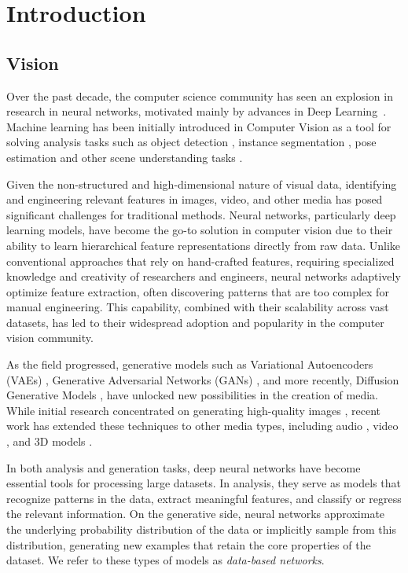 \chapter{Introduction}

\section{Vision}

Over the past decade, the computer science community has seen an explosion in research in neural networks, motivated mainly by advances in Deep Learning~\citep{lecun2015deep,goodfellow2016deep}. Machine learning has been initially introduced in Computer Vision as a tool for solving analysis tasks such as object detection \citep{redmon2016you}, instance segmentation \citep{he2017mask}, pose estimation \citep{cao2019openpose} and other scene understanding tasks \citep{eigen2014depth, long2015fully, vinyals2015show, guler2018densepose}. 

Given the non-structured and high-dimensional nature of visual data, identifying and engineering relevant features in images, video, and other media has posed significant challenges for traditional methods. Neural networks, particularly deep learning models, have become the go-to solution in computer vision due to their ability to learn hierarchical feature representations directly from raw data. Unlike conventional approaches that rely on hand-crafted features, requiring specialized knowledge and creativity of researchers and engineers, neural networks adaptively optimize feature extraction, often discovering patterns that are too complex for manual engineering. This capability, combined with their scalability across vast datasets, has led to their widespread adoption and popularity in the computer vision community.

As the field progressed, generative models such as Variational Autoencoders (VAEs) \citep{kingma2014auto}, Generative Adversarial Networks (GANs) \citep{goodfellow2014generative}, and more recently, Diffusion Generative Models \citep{ho2020denoising}, have unlocked new possibilities in the creation of media. While initial research concentrated on generating high-quality images \citep{karras2017progressive}, recent work has extended these techniques to other media types, including audio \citep{donahue2018adversarial}, video \citep{vondrick2016generating}, and 3D models \citep{wu2016shapenets}.

In both analysis and generation tasks, deep neural networks have become essential tools for processing large datasets. In analysis, they serve as models that recognize patterns in the data, extract meaningful features, and classify or regress the relevant information. On the generative side, neural networks approximate the underlying probability distribution of the data or implicitly sample from this distribution, generating new examples that retain the core properties of the dataset. We refer to these types of models as \textit{data-based networks}.

